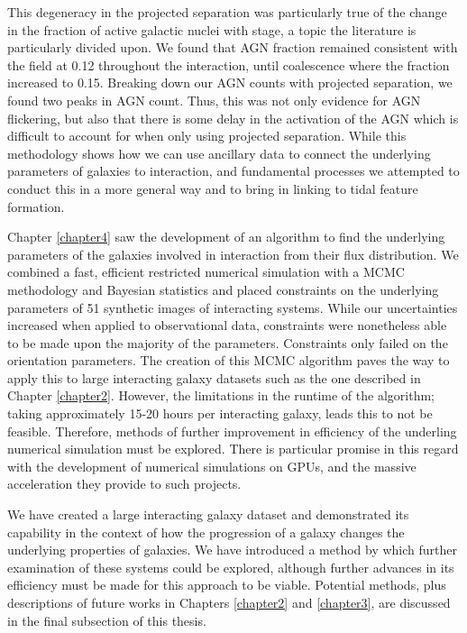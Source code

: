 This degeneracy in the projected separation was particularly true of the change in the fraction of active galactic nuclei with stage, a topic the literature is particularly divided upon. We found that AGN fraction remained consistent with the field at 0.12 throughout the interaction, until coalescence where the fraction increased to 0.15. Breaking down our AGN counts with projected separation, we found two peaks in AGN count. Thus, this was not only evidence for AGN flickering, but also that there is some delay in the activation of the AGN which is difficult to account for when only using projected separation. While this methodology shows how we can use ancillary data to connect the underlying parameters of galaxies to interaction, and fundamental processes we attempted to conduct this in a more general way and to bring in linking to tidal feature formation. 

Chapter \ref{chapter4} saw the development of an algorithm to find the underlying parameters of the galaxies involved in interaction from their flux distribution. We combined a fast, efficient restricted numerical simulation with a MCMC methodology and Bayesian statistics and placed constraints on the underlying parameters of 51 synthetic images of interacting systems. While our uncertainties increased when applied to observational data, constraints were nonetheless able to be made upon the majority of the parameters. Constraints only failed on the orientation parameters. The creation of this MCMC algorithm paves the way to apply this to large interacting galaxy datasets such as the one described in Chapter \ref{chapter2}. However, the limitations in the runtime of the algorithm; taking approximately 15-20 hours per interacting galaxy, leads this to not be feasible. Therefore, methods of further improvement in efficiency of the underling numerical simulation must be explored. There is particular promise in this regard with the development of numerical simulations on GPUs, and the massive acceleration they provide to such projects.

We have created a large interacting galaxy dataset and demonstrated its capability in the context of how the progression of a galaxy changes the underlying properties of galaxies. We have introduced a method by which further examination of these systems could be explored, although further advances in its efficiency must be made for this approach to be viable. Potential methods, plus descriptions of future works in Chapters \ref{chapter2} and \ref{chapter3}, are discussed in the final subsection of this thesis.

